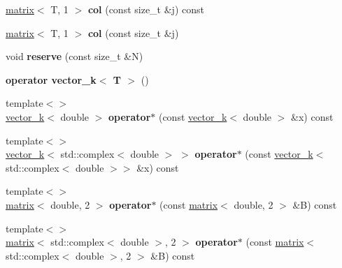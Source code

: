 \begin{DoxyCompactItemize}
\item 
\hypertarget{classkeycpp_1_1matrix_af3976323ba896d2032e9d56faea5580b}{\hyperlink{classkeycpp_1_1matrix}{matrix}$<$ T, 1 $>$ {\bfseries col} (const size\-\_\-t \&j) const }\label{classkeycpp_1_1matrix_af3976323ba896d2032e9d56faea5580b}

\item 
\hypertarget{classkeycpp_1_1matrix_aac7e808302a0316596e88528ce18300b}{\hyperlink{classkeycpp_1_1matrix}{matrix}$<$ T, 1 $>$ {\bfseries col} (const size\-\_\-t \&j)}\label{classkeycpp_1_1matrix_aac7e808302a0316596e88528ce18300b}

\item 
\hypertarget{classkeycpp_1_1matrix_aed824ccff1fa8367ebf759704e063e36}{void {\bfseries reserve} (const size\-\_\-t \&N)}\label{classkeycpp_1_1matrix_aed824ccff1fa8367ebf759704e063e36}

\item 
\hypertarget{classkeycpp_1_1matrix_aae00b6698c9910ac76c1467877b66b07}{{\bfseries operator vector\-\_\-k$<$ T $>$} ()}\label{classkeycpp_1_1matrix_aae00b6698c9910ac76c1467877b66b07}

\item 
\hypertarget{classkeycpp_1_1matrix_ab6983d6eee299ccb2998c58bd0e027c9}{{\footnotesize template$<$$>$ }\\\hyperlink{classkeycpp_1_1vector__k}{vector\-\_\-k}$<$ double $>$ {\bfseries operator$\ast$} (const \hyperlink{classkeycpp_1_1vector__k}{vector\-\_\-k}$<$ double $>$ \&x) const}\label{classkeycpp_1_1matrix_ab6983d6eee299ccb2998c58bd0e027c9}

\item 
\hypertarget{classkeycpp_1_1matrix_ac785e98c5cd30b6070e1532236dbc26e}{{\footnotesize template$<$$>$ }\\\hyperlink{classkeycpp_1_1vector__k}{vector\-\_\-k}$<$ std\-::complex$<$ double $>$ $>$ {\bfseries operator$\ast$} (const \hyperlink{classkeycpp_1_1vector__k}{vector\-\_\-k}$<$ std\-::complex$<$ double $>$$>$ \&x) const}\label{classkeycpp_1_1matrix_ac785e98c5cd30b6070e1532236dbc26e}

\item 
\hypertarget{classkeycpp_1_1matrix_a37ff7d47a6219cf17fb4ebde48f8c7b2}{{\footnotesize template$<$$>$ }\\\hyperlink{classkeycpp_1_1matrix}{matrix}$<$ double, 2 $>$ {\bfseries operator$\ast$} (const \hyperlink{classkeycpp_1_1matrix}{matrix}$<$ double, 2 $>$ \&B) const}\label{classkeycpp_1_1matrix_a37ff7d47a6219cf17fb4ebde48f8c7b2}

\item 
\hypertarget{classkeycpp_1_1matrix_af5588cdcb9eef1da2fe80623204c5199}{{\footnotesize template$<$$>$ }\\\hyperlink{classkeycpp_1_1matrix}{matrix}$<$ std\-::complex$<$ double $>$, 2 $>$ {\bfseries operator$\ast$} (const \hyperlink{classkeycpp_1_1matrix}{matrix}$<$ std\-::complex$<$ double $>$, 2 $>$ \&B) const}\label{classkeycpp_1_1matrix_af5588cdcb9eef1da2fe80623204c5199}

\end{DoxyCompactItemize}

